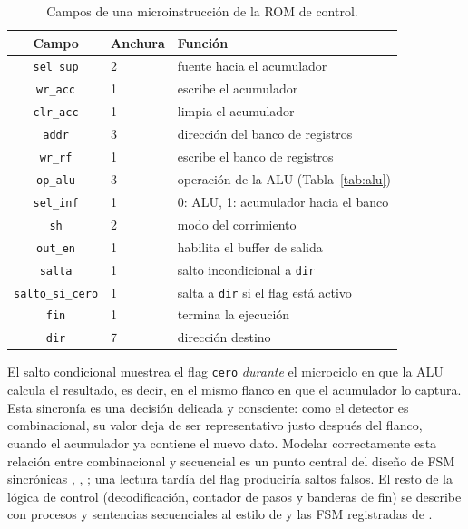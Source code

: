 \documentclass[llncs]{llncs}
\begin{document}
\begin{table}[t]
\centering
\caption{Campos de una microinstrucción de la ROM de control.}
\label{tab:microinstruccion}
\begin{tabular}{cll}
\hline
Campo & Anchura & Función \\
\hline
\texttt{sel\_sup}  & 2 & fuente hacia el acumulador \\
\texttt{wr\_acc}   & 1 & escribe el acumulador \\
\texttt{clr\_acc}  & 1 & limpia el acumulador \\
\texttt{addr}      & 3 & dirección del banco de registros \\
\texttt{wr\_rf}    & 1 & escribe el banco de registros \\
\texttt{op\_alu}   & 3 & operación de la ALU (Tabla~\ref{tab:alu}) \\
\texttt{sel\_inf}  & 1 & 0: ALU, 1: acumulador hacia el banco \\
\texttt{sh}        & 2 & modo del corrimiento \\
\texttt{out\_en}   & 1 & habilita el buffer de salida \\
\texttt{salta}     & 1 & salto incondicional a \texttt{dir} \\
\texttt{salto\_si\_cero} & 1 & salta a \texttt{dir} si el flag está activo \\
\texttt{fin}       & 1 & termina la ejecución \\
\texttt{dir}       & 7 & dirección destino \\
\hline
\end{tabular}
\end{table}

El salto condicional muestrea el flag \texttt{cero} \emph{durante} el
microciclo en que la ALU calcula el resultado, es decir, en el mismo
flanco en que el acumulador lo captura. Esta sincronía es una decisión
delicada y consciente: como el detector es combinacional, su valor deja
de ser representativo justo después del flanco, cuando el acumulador ya
contiene el nuevo dato. Modelar correctamente esta relación entre
combinacional y secuencial es un punto central del diseño de FSM
sincrónicas \cite{mano2016lcdf}, \cite{harris2015ddca},
\cite{roth2013fld}; una lectura tardía del flag produciría saltos
falsos. El resto de la lógica de control (decodificación, contador de
pasos y banderas de fin) se describe con procesos y sentencias
secuenciales al estilo de \cite{ashenden2008vhdl} y las FSM registradas
de \cite{katz2005cld}.
\end{document}
